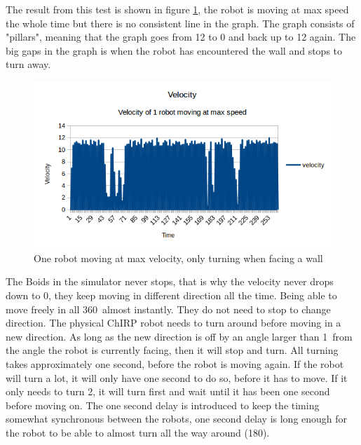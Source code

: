 The result from this test is shown in figure \ref{fig:speed}, the robot is moving at max speed the whole time but there is no consistent line in the graph. The graph consists of "pillars", meaning that the graph goes from 12 to 0 and back up to 12 again. The big gaps in the graph is when the robot has encountered the wall and stops to turn away.

\begin{figure}[h]
\begin{center}
\includegraphics[width=0.8\linewidth]{figs/speed}
\end{center}
\caption[Velocity of robot]{One robot moving at max velocity, only turning when facing a wall}
\label{fig:speed}
\end{figure}

The Boids in the simulator never stops, that is why the velocity never drops down to 0, they keep moving in different direction all the time. Being able to move freely in all 360\textdegree\ almost instantly. They do not need to stop to change direction.
The physical ChIRP robot needs to turn around before moving in a new direction. As long as the new direction is off by an angle larger than 1\textdegree\ from the angle the robot is currently facing, then it will stop and turn. All turning takes approximately one second, before the robot is moving again. If the robot will turn a lot, it will only have one second to do so, before it has to move. If it only needs to turn 2\textdegree, it will turn first and wait until it has been one second before moving on.
The one second delay is introduced to keep the timing somewhat synchronous between the robots, one second delay is long enough for the robot to be able to almost turn all the way around (180\textdegree). 


